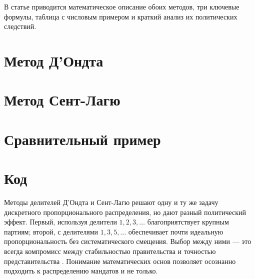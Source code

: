 \documentclass[otchet]{SCWorks}
\begin{document}
В статье приводится математическое описание обоих методов, три ключевые формулы, таблица с числовым примером и краткий анализ их политических следствий.
\section{Метод Д'Ондта}

\section{Метод Сент-Лагю}

\section{Сравнительный пример}

\section{Код}


\conclusion
Методы делителей Д’Ондта и Сент-Лагю решают одну и ту же задачу дискретного пропорционального распределения, но дают разный политический эффект. Первый, используя делители  $1,2,3,\ldots$ благоприятствует крупным партиям; второй, с делителями 
$1,3,5,\ldots$ обеспечивает почти идеальную пропорциональность без систематического смещения. Выбор между ними — это всегда компромисс между стабильностью правительства и точностью представительства \cite{balfair}. Понимание математических основ позволяет осознанно подходить к распределению мандатов и не только.
 \nocite{*}




\appendix
\end{document}
